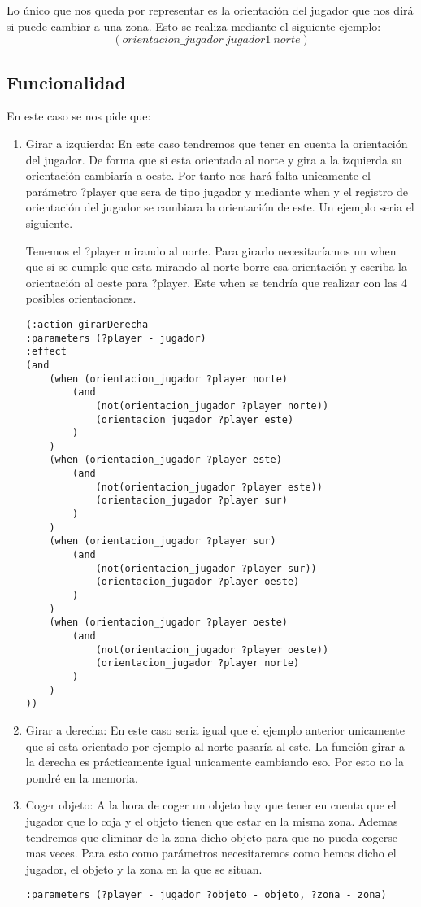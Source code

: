 \documentclass[]{article}
\begin{document}
Lo único que nos queda por representar es la orientación del jugador que nos dirá si puede cambiar a una zona. Esto se realiza mediante el siguiente ejemplo:
$$
(orientacion\_jugador\ jugador1\ norte)
$$

\subsection{Funcionalidad}
En este caso se nos pide que: 
\begin{enumerate}
\item{Girar a izquierda:}
En este caso tendremos que tener en cuenta la orientación del jugador. De forma que si esta orientado al norte y gira a la izquierda su orientación cambiaría a oeste. Por tanto nos hará falta unicamente el parámetro ?player que sera de tipo jugador y mediante when y el registro de orientación del jugador se cambiara la orientación de este. Un ejemplo seria el siguiente.
\newline

Tenemos el ?player mirando al norte. Para girarlo necesitaríamos un when que si se cumple que esta mirando al norte borre esa orientación y escriba la orientación al oeste para ?player. Este when se tendría que realizar con las 4 posibles orientaciones.

\begin{lstlisting}
(:action girarDerecha
:parameters (?player - jugador)
:effect
(and
	(when (orientacion_jugador ?player norte) 
		(and 
			(not(orientacion_jugador ?player norte)) 
			(orientacion_jugador ?player este)
		)
	)
	(when (orientacion_jugador ?player este) 
		(and 
			(not(orientacion_jugador ?player este)) 
			(orientacion_jugador ?player sur)
		)
	)
	(when (orientacion_jugador ?player sur) 
		(and 
			(not(orientacion_jugador ?player sur)) 
			(orientacion_jugador ?player oeste)
		)
	)
	(when (orientacion_jugador ?player oeste) 
		(and 
			(not(orientacion_jugador ?player oeste)) 
			(orientacion_jugador ?player norte)
		)
	)
))
\end{lstlisting}


\item{Girar a derecha:} En este caso seria igual que el ejemplo anterior unicamente que si esta orientado por ejemplo al norte pasaría al este. La función girar a la derecha es prácticamente igual unicamente cambiando eso. Por esto no la pondré en la memoria.

\item{Coger objeto:} A la hora de coger un objeto hay que tener en cuenta que el jugador que lo coja y el objeto tienen que estar en la misma zona. Ademas tendremos que eliminar de la zona dicho objeto para que no pueda cogerse mas veces.
Para esto como parámetros necesitaremos como hemos dicho el jugador, el objeto y la zona en la que se situan. 
\begin{lstlisting}
:parameters	(?player - jugador ?objeto - objeto, ?zona - zona)
\end{lstlisting}


\end{enumerate}
\end{document}
